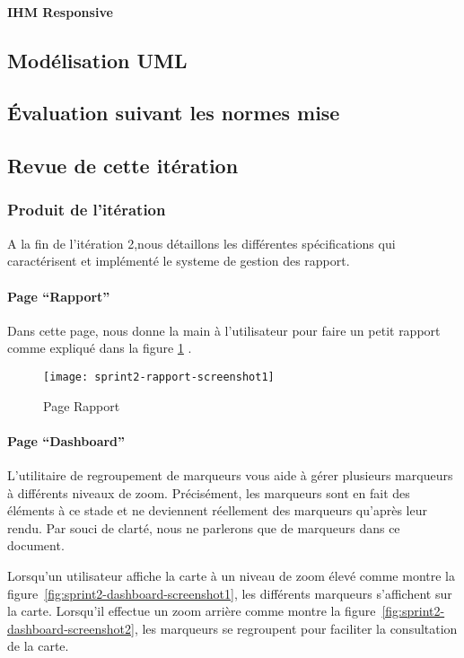\paragraph{IHM Responsive}

\subsection{Modélisation UML}

\subsection{Évaluation suivant les normes mise}
\subsection{Revue de cette itération}
\subsubsection{Produit de l'itération}

A la fin de l'itération 2,nous détaillons les différentes spécifications qui caractérisent et 
implémenté le systeme de gestion des rapport.
\paragraph{Page ``Rapport''}
Dans cette page, nous donne la main à l'utilisateur pour faire un petit rapport comme expliqué dans la
figure \ref{fig:sprint2-rapport-screenshot1} . 
\begin{figure}[htbp]
  \centering
  \texttt{[image: sprint2-rapport-screenshot1]}
  \caption{Page Rapport}
  \label{fig:sprint2-rapport-screenshot1}
\end{figure}
\paragraph{Page ``Dashboard''}
L'utilitaire de regroupement de marqueurs vous aide à gérer plusieurs marqueurs à différents niveaux de zoom.
Précisément, les  marqueurs  sont en fait des éléments à ce stade et ne deviennent réellement des
marqueurs qu'après leur rendu. Par souci de clarté, nous ne parlerons que de marqueurs 
dans ce document.

Lorsqu'un utilisateur affiche la carte à un niveau de zoom élevé comme montre la
figure~\ref{fig:sprint2-dashboard-screenshot1}, les différents marqueurs
s'affichent sur la carte. Lorsqu'il effectue un zoom arrière comme montre la
figure~\ref{fig:sprint2-dashboard-screenshot2}, les marqueurs se regroupent pour faciliter la consultation de la carte.

